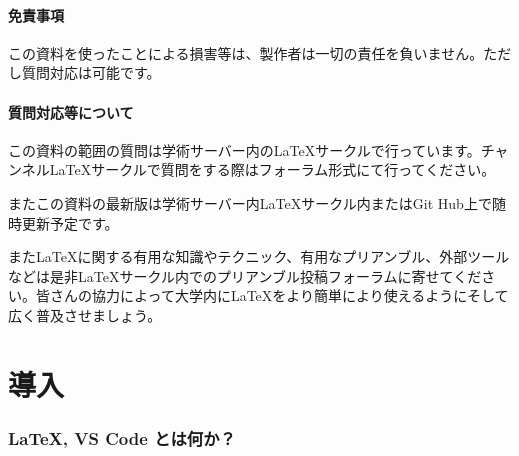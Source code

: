 \documentclass[titlepage]{ltjsarticle}
\begin{document}
\subsection{免責事項}
この資料を使ったことによる損害等は、製作者は一切の責任を負いません。ただし質問対応は可能です。
\subsection{質問対応等について}
この資料の範囲の質問は学術サーバー内のLaTeXサークルで行っています。チャンネルLaTeXサークルで質問をする際はフォーラム形式にて行ってください。

またこの資料の最新版は学術サーバー内LaTeXサークル内またはGit Hub上で随時更新予定です。

また\LaTeX に関する有用な知識やテクニック、有用なプリアンブル、外部ツールなどは是非LaTeXサークル内でのプリアンブル投稿フォーラムに寄せてください。皆さんの協力によって大学内に\LaTeX をより簡単により使えるようにそして広く普及させましょう。
\clearpage
\tableofcontents
\clearpage

\part{導入}
\section{\LaTeX , VS Code とは何か？}
\end{document}
